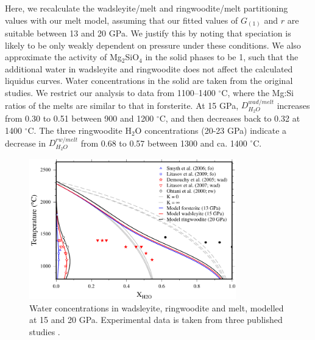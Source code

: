 \documentclass[review]{elsarticle}
\begin{document}
Here, we recalculate the wadsleyite/melt and ringwoodite/melt partitioning values with our melt model, assuming that our fitted values of $G_{(1)}$ and $r$ are suitable between 13 and 20 GPa. We justify this by noting that speciation is likely to be only weakly dependent on pressure under these conditions. We also approximate the activity of Mg$_2$SiO$_4$ in the solid phases to be 1, such that the additional water in wadsleyite and ringwoodite does not affect the calculated liquidus curves. Water concentrations in the solid are taken from the original studies. We restrict our analysis to data from 1100--1400 $^{\circ}$C, where the Mg:Si ratios of the melts are similar to that in forsterite. At 15 GPa, $D^{wad/melt}_{H_2O}$ increases from 0.30 to 0.51 between 900 and 1200 $^{\circ}$C, and then decreases back to 0.32 at 1400 $^{\circ}$C. The three ringwoodite H$_2$O concentrations (20-23 GPa) indicate a decrease in $D^{rw/melt}_{H_2O}$ from 0.68 to 0.57 between 1300 and ca. 1400 $^{\circ}$C.

\begin{figure}[ht!]
  \centering
      \includegraphics[width=0.8\textwidth]{figures/fo_wad_rw}
  \caption{Water concentrations in wadsleyite, ringwoodite and melt, modelled at 15 and 20 GPa. Experimental data is taken from three published studies \citep{OMY2000,DDFK2005,LSOK2011}.}
  \label{fig:fo_wad_rw_melt}
\end{figure}
\end{document}
